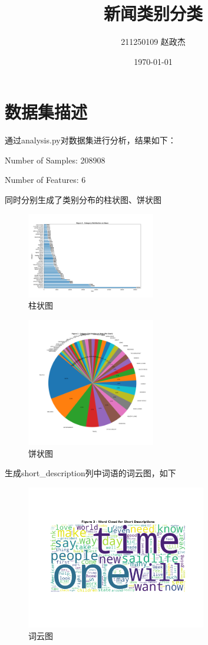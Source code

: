 \documentclass{article}
\begin{document}
\title{新闻类别分类}
\author{211250109 赵政杰}
\date{\today}
\maketitle

\section{数据集描述}
通过analysis.py对数据集进行分析，结果如下：\par
Number of Samples: 208908\par
Number of Features: 6\par
同时分别生成了类别分布的柱状图、饼状图
\begin{figure}[H]
    \centering
    \includegraphics[width=0.5\textwidth]{./pic/1.png}
    \caption{柱状图}
\end{figure}

\begin{figure}[H]
    \centering
    \includegraphics[width=0.5\textwidth]{./pic/2.png}
    \caption{饼状图}
\end{figure}
生成short\_description列中词语的词云图，如下
\begin{figure}[H]
    \centering
    \includegraphics[width=0.7\textwidth]{./pic/3.png}
    \caption{词云图}
\end{figure}
\end{document}
